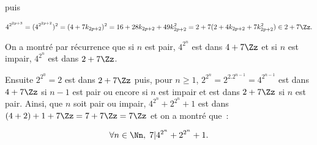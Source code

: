 {\begin{enumerate}
{puis 

$$4^{2^{2p+3}}=(4^{2^{2p+2}})^2=(4+7k_{2p+2})^2=16+28k_{2p+2}+49k_{2p+2}^2=2+7(2+4k_{2p+2}+7k_{2p+2}^2)\in2+7\Zz.$$

On a montré par récurrence que si $n$ est pair, $4^{2^n}$ est dans $4+7\Zz$ et si $n$ est impair, $4^{2^n}$ est dans $2+7\Zz$.

Ensuite $2^{2^0}=2$ est dans $2+7\Zz$ puis, pour $n\geq1$, $2^{2^n}=2^{2.2^{n-1}}=4^{2^{n-1}}$ est dans $4+7\Zz$ si $n-1$ est pair ou encore si $n$ est impair et est dans $2+7\Zz$ si $n$ est pair. Ainsi, que $n$ soit pair ou impair, $4^{2^n}+2^{2^n}+1$ est dans $(4+2)+1+7\Zz=7+7\Zz=7\Zz$ et on a montré que~:

$$\forall n\in\Nn,\;7|4^{2^n}+2^{2^n}+1.$$}
\end{enumerate}
}